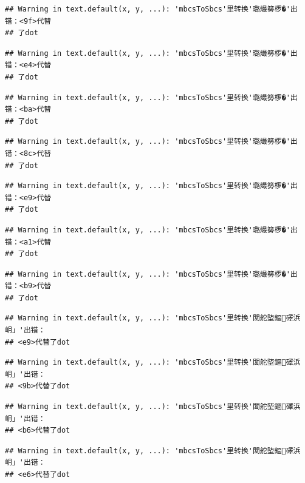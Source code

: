 \documentclass[
]{book}
\begin{document}
\begin{verbatim}
## Warning in text.default(x, y, ...): 'mbcsToSbcs'里转换'璐熶簩椤�'出错：<9f>代替
## 了dot
\end{verbatim}

\begin{verbatim}
## Warning in text.default(x, y, ...): 'mbcsToSbcs'里转换'璐熶簩椤�'出错：<e4>代替
## 了dot
\end{verbatim}

\begin{verbatim}
## Warning in text.default(x, y, ...): 'mbcsToSbcs'里转换'璐熶簩椤�'出错：<ba>代替
## 了dot
\end{verbatim}

\begin{verbatim}
## Warning in text.default(x, y, ...): 'mbcsToSbcs'里转换'璐熶簩椤�'出错：<8c>代替
## 了dot
\end{verbatim}

\begin{verbatim}
## Warning in text.default(x, y, ...): 'mbcsToSbcs'里转换'璐熶簩椤�'出错：<e9>代替
## 了dot
\end{verbatim}

\begin{verbatim}
## Warning in text.default(x, y, ...): 'mbcsToSbcs'里转换'璐熶簩椤�'出错：<a1>代替
## 了dot
\end{verbatim}

\begin{verbatim}
## Warning in text.default(x, y, ...): 'mbcsToSbcs'里转换'璐熶簩椤�'出错：<b9>代替
## 了dot
\end{verbatim}

\begin{verbatim}
## Warning in text.default(x, y, ...): 'mbcsToSbcs'里转换'闆舵埅鏂礋浜岄」'出错：
## <e9>代替了dot
\end{verbatim}

\begin{verbatim}
## Warning in text.default(x, y, ...): 'mbcsToSbcs'里转换'闆舵埅鏂礋浜岄」'出错：
## <9b>代替了dot
\end{verbatim}

\begin{verbatim}
## Warning in text.default(x, y, ...): 'mbcsToSbcs'里转换'闆舵埅鏂礋浜岄」'出错：
## <b6>代替了dot
\end{verbatim}

\begin{verbatim}
## Warning in text.default(x, y, ...): 'mbcsToSbcs'里转换'闆舵埅鏂礋浜岄」'出错：
## <e6>代替了dot
\end{verbatim}
\end{document}

